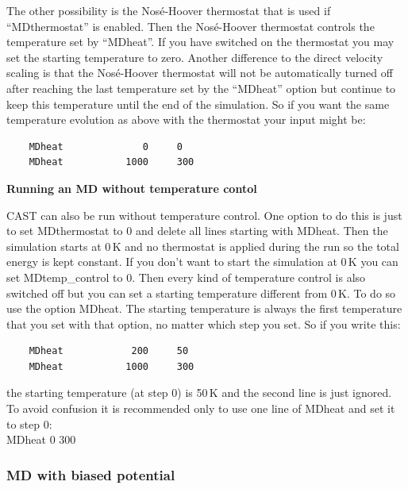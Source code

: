 \documentclass[10pt,a4paper]{article} %
\begin{document}
	The other possibility is the Nosé-Hoover thermostat that is used if ``MDthermostat'' is enabled. Then the Nosé-Hoover thermostat controls the temperature set by ``MDheat''. If you have switched on the thermostat you may set the starting temperature to zero. Another difference to the direct velocity scaling is that the Nosé-Hoover thermostat will not be automatically turned off after reaching the last temperature set by the ``MDheat'' option but continue to keep this temperature until the end of the simulation. So if you want the same temperature evolution as above with the thermostat your input might be:
		\begin{lstlisting}
	MDheat			    0  	  0
	MDheat 			 1000     300
	\end{lstlisting}
	
\textbf{	Running an MD without temperature contol}
	
	\ac{CAST} can also be run without temperature control. One option to do this is just to set MDthermostat to 0 and delete all lines starting with MDheat. Then the simulation starts at 0\,K and no thermostat is applied during the run so the total energy is kept constant. If you don't want to start the simulation at 0\,K you can set MDtemp\_control to 0. Then every kind of temperature control is also switched off but you can set a starting temperature different from 0\,K. To do so use the option MDheat. The starting temperature is always the first temperature that you set with that option, no matter which step you set. So if you write this:
			\begin{lstlisting}
	MDheat			  200  	  50
	MDheat 			 1000     300
	\end{lstlisting}
	the starting temperature (at step 0) is 50\,K and the second line is just ignored. To avoid confusion it is recommended only to use one line of MDheat and set it to step 0: \\MDheat  \hspace{2cm}  0 \hspace{0.5cm}  300
		
	\subsubsection{MD with biased potential}
	
\end{document}
